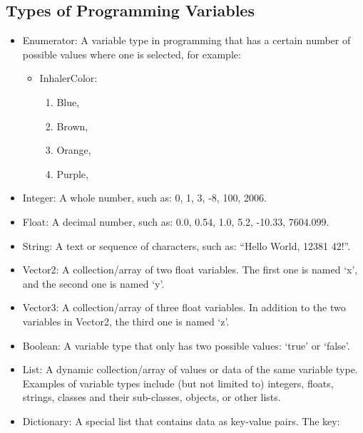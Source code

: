 \documentclass[a4paper, 12pt]{article}
\begin{document}
\subsection{Types of Programming Variables}
\label{ProgDefinitionsSec}
\begin{itemize}
    \item{Enumerator: A variable type in programming that has a certain number of possible values where one is selected, for example:
    
    \begin{itemize}
    \item{InhalerColor:}
    	\begin{enumerate}
    	\item{Blue,}
    	\item{Brown,}
    	\item{Orange,}
    	\item{Purple,}
    	\end{enumerate}
    \end{itemize} 
    }   
    \item{Integer: A whole number, such as: 0, 1, 3, -8, 100, 2006.}
    
    \item{Float: A decimal number, such as: 0.0, 0.54, 1.0, 5.2, -10.33, 7604.099.}
    
    \item{String: A text or sequence of characters, such as: “Hello World, 12381 42!”.}
    
    \item{{\codefont Vector2}: A collection/array of two float variables. The first one is named ‘x’, and the second one is named ‘y’.}
    
    \item{{\codefont Vector3}: A collection/array of three float variables. In addition to the two variables in {\codefont Vector2}, the third one is named ‘z’.}
    
    \item{Boolean: A variable type that only has two possible values: ‘{\codefont true}’ or ‘{\codefont false}’.}
    \item{List: A dynamic collection/array of values or data of the same variable type. Examples of variable types include (but not limited to) integers, floats, strings, classes and their sub-classes, objects, or other lists.}
    
        \item{Dictionary: A special list that contains data as key-value pairs. The key:
        
}
\end{itemize}
\end{document}
